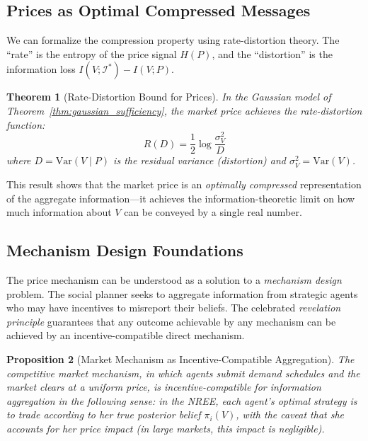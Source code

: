 \documentclass[12pt,a4paper]{article}
\newtheorem{theorem}{Theorem}[section]
\newtheorem{proposition}[theorem]{Proposition}
\theoremstyle{definition}
\newcommand{\I}{\mathcal{I}}
\newcommand{\Var}{\mathrm{Var}}
\begin{document}
\subsection{Prices as Optimal Compressed Messages}

We can formalize the compression property using rate-distortion theory. The ``rate'' is the entropy of the price signal $H(P)$, and the ``distortion'' is the information loss $I(V; \I^*) - I(V; P)$.

\begin{theorem}[Rate-Distortion Bound for Prices]\label{thm:rate_distortion}
In the Gaussian model of Theorem~\ref{thm:gaussian_sufficiency}, the market price achieves the rate-distortion function:
\begin{equation}
    R(D) = \frac{1}{2} \log \frac{\sigma_V^2}{D}
\end{equation}
where $D = \Var(V \mid P)$ is the residual variance (distortion) and $\sigma_V^2 = \Var(V)$.
\end{theorem}

This result shows that the market price is an \emph{optimally compressed} representation of the aggregate information---it achieves the information-theoretic limit on how much information about $V$ can be conveyed by a single real number.

\subsection{Mechanism Design Foundations}

The price mechanism can be understood as a solution to a \emph{mechanism design} problem. The social planner seeks to aggregate information from strategic agents who may have incentives to misreport their beliefs. The celebrated \emph{revelation principle} \citep{myerson1981} guarantees that any outcome achievable by any mechanism can be achieved by an incentive-compatible direct mechanism.

\begin{proposition}[Market Mechanism as Incentive-Compatible Aggregation]\label{prop:ic}
The competitive market mechanism, in which agents submit demand schedules and the market clears at a uniform price, is incentive-compatible for information aggregation in the following sense: in the NREE, each agent's optimal strategy is to trade according to her true posterior belief $\pi_i(V)$, with the caveat that she accounts for her price impact (in large markets, this impact is negligible).
\end{proposition}
\end{document}
